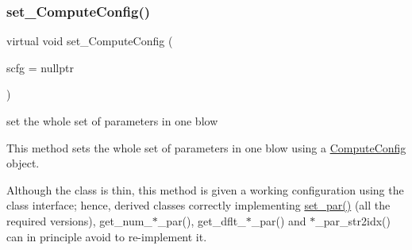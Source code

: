 \mbox{\label{class_s_m_spp__di__unipi__it_1_1_thin_compute_interface_a8f4741c9baa5d7de2bd6129f3d08bf16}} 
\subsubsection{\texorpdfstring{set\+\_\+\+Compute\+Config()}{set\_ComputeConfig()}}
{\footnotesize\ttfamily virtual void set\+\_\+\+Compute\+Config (\begin{DoxyParamCaption}\item[{\mbox{\hyperlink{class_s_m_spp__di__unipi__it_1_1_compute_config}{Compute\+Config}} $\ast$}]{scfg = {\ttfamily nullptr} }\end{DoxyParamCaption})\hspace{0.3cm}{\ttfamily [virtual]}}



set the whole set of parameters in one blow 

This method sets the whole set of parameters in one blow using a \mbox{\hyperlink{class_s_m_spp__di__unipi__it_1_1_compute_config}{Compute\+Config}} object.

Although the class is thin, this method is given a working configuration using the class interface; hence, derived classes correctly implementing \mbox{\hyperlink{class_s_m_spp__di__unipi__it_1_1_thin_compute_interface_a73669f587bb938b587c54ad7e73ec297}{set\+\_\+par()}} (all the required versions), get\+\_\+num\+\_\+$\ast$\+\_\+par(), get\+\_\+dflt\+\_\+$\ast$\+\_\+par() and $\ast$\+\_\+par\+\_\+str2idx() can in principle avoid to re-\/implement it.

